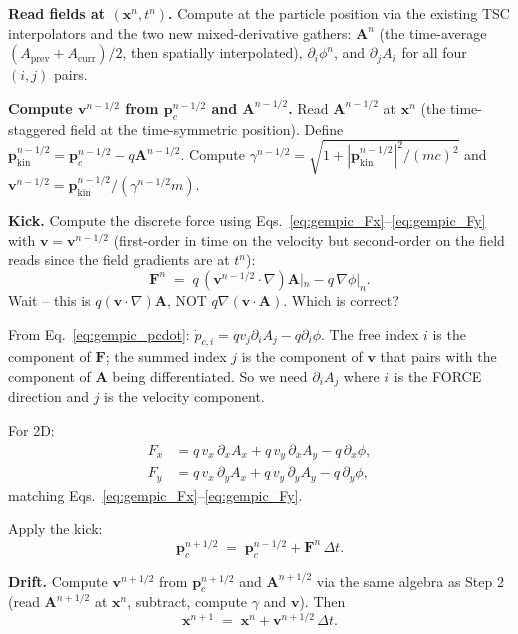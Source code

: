 \documentclass[11pt,a4paper]{article}
\newcommand{\vv}[1]{\mathbf{#1}}
\begin{document}
\begin{algsteps}
  \item \textbf{Read fields at $(\vv{x}^n, t^n)$.}
    Compute at the particle position via the existing TSC
    interpolators and the two new mixed-derivative gathers:
    $\vv{A}^n$ (the time-average $(A_{\mathrm{prev}} +
    A_{\mathrm{curr}})/2$, then spatially interpolated),
    $\partial_i \phi^n$, and $\partial_j A_i$ for all four
    $(i, j)$ pairs.
  \item \textbf{Compute $\vv{v}^{n-1/2}$ from $\vv{p}_c^{n-1/2}$
    and $\vv{A}^{n-1/2}$.}
    Read $\vv{A}^{n-1/2}$ at $\vv{x}^n$ (the time-staggered
    field at the time-symmetric position).
    Define $\vv{p}_{\mathrm{kin}}^{n-1/2} = \vv{p}_c^{n-1/2}
    - q\vv{A}^{n-1/2}$.
    Compute $\gamma^{n-1/2} = \sqrt{1 +
    |\vv{p}_{\mathrm{kin}}^{n-1/2}|^2/(m c)^2}$ and
    $\vv{v}^{n-1/2} = \vv{p}_{\mathrm{kin}}^{n-1/2}/(\gamma^{n-1/2} m)$.
  \item \textbf{Kick.}
    Compute the discrete force using Eqs.~\eqref{eq:gempic_Fx}--\eqref{eq:gempic_Fy}
    with $\vv{v} = \vv{v}^{n-1/2}$ (first-order in time on the
    velocity but second-order on the field reads since the
    field gradients are at $t^n$):
    \begin{equation}
    \vv{F}^n \;=\; q\,(\vv{v}^{n-1/2}\cdot\nabla)\vv{A}|_{n}
                - q\,\nabla\phi|_{n}.
    \end{equation}
    Wait -- this is $q (\vv{v}\cdot\nabla)\vv{A}$, NOT
    $q\nabla(\vv{v}\cdot\vv{A})$.  Which is correct?

    From Eq.~\eqref{eq:gempic_pcdot}:
    $\dot{p}_{c,i} = q v_j \partial_i A_j - q \partial_i \phi$.
    The free index $i$ is the component of $\vv{F}$; the summed
    index $j$ is the component of $\vv{v}$ that pairs with the
    component of $\vv{A}$ being differentiated.  So we need
    $\partial_i A_j$ where $i$ is the FORCE direction and $j$ is
    the velocity component.

    For 2D:
    \begin{align}
    F_x &= q\,v_x\,\partial_x A_x + q\,v_y\,\partial_x A_y - q\,\partial_x\phi,\\
    F_y &= q\,v_x\,\partial_y A_x + q\,v_y\,\partial_y A_y - q\,\partial_y\phi,
    \end{align}
    matching Eqs.~\eqref{eq:gempic_Fx}--\eqref{eq:gempic_Fy}.

    Apply the kick:
    \begin{equation}
    \label{eq:gempic_kick}
    \vv{p}_c^{n+1/2} \;=\; \vv{p}_c^{n-1/2} + \vv{F}^n\,\Delta t.
    \end{equation}
  \item \textbf{Drift.}
    Compute $\vv{v}^{n+1/2}$ from $\vv{p}_c^{n+1/2}$ and
    $\vv{A}^{n+1/2}$ via the same algebra as Step 2 (read
    $\vv{A}^{n+1/2}$ at $\vv{x}^n$, subtract, compute $\gamma$
    and $\vv{v}$).  Then
    \begin{equation}
    \label{eq:gempic_drift}
    \vv{x}^{n+1} \;=\; \vv{x}^n + \vv{v}^{n+1/2}\,\Delta t.
    \end{equation}
\end{algsteps}
\end{document}
